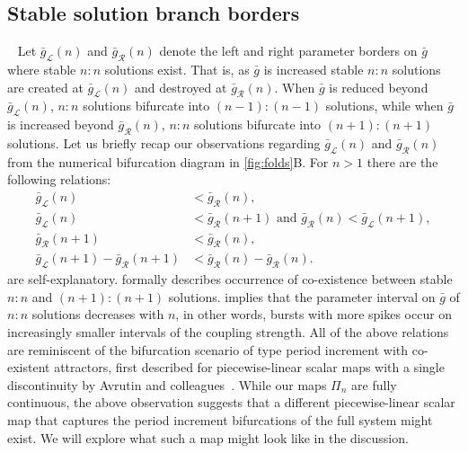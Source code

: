 \subsection{Stable solution branch borders}
~\label{sec:borders}
Let $\bar g_{\mathcal{L}}(n)$ and $\bar g_{\mathcal{R}}(n)$ denote the left and right parameter borders on $\bar g$ where stable $n:n$ solutions exist.
That is, as $\bar g$ is increased stable $n:n$ solutions are created at $\bar g_{\mathcal{L}}(n)$ and destroyed at $\bar g_{\mathcal{R}}(n)$.
When $\bar g$ is reduced beyond $\bar g_{\mathcal{L}}(n)$, $n:n$ solutions bifurcate into $(n-1):(n-1)$ solutions, while when $\bar g$ is increased beyond $\bar g_{\mathcal{R}}(n)$, $n:n$ solutions bifurcate into $(n+1):(n+1)$ solutions.
Let us briefly recap our observations regarding $\bar g_{\mathcal{L}}(n)$ and $\bar g_{\mathcal{R}}(n)$ from the numerical bifurcation diagram in \cref{fig:folds}B.
For $n>1$ there are the following relations:
\begin{align}
	\bar g_{\mathcal{L}}(n)                               & < \bar g_{\mathcal{R}}(n)\label{eq:easy1},                                                                 \\
	\bar g_{\mathcal{L}}(n)                               & < \bar g_{\mathcal{R}}(n+1)\text{ and } \bar g_{\mathcal{R}}(n)<\bar g_{\mathcal{L}}(n+1)\label{eq:easy2}, \\
	\bar g_{\mathcal{R}}(n+1)                             & < \bar g_{\mathcal{R}}(n)\label{eq:coexistence},                                                           \\
	\bar g_{\mathcal{L}}(n+1) - \bar g_{\mathcal{R}}(n+1) & < \bar g_{\mathcal{R}}(n) - \bar g_{\mathcal{R}}(n)\label{eq:robustness}.
\end{align}
 are self-explanatory.
 formally describes occurrence of co-existence between stable $n:n$ and $(n+1):(n+1)$ solutions.
 implies that the parameter interval on $\bar g$ of $n:n$ solutions decreases with $n$, in other words, bursts with more spikes occur on increasingly smaller intervals of the coupling strength.
All of the above relations are reminiscent of the bifurcation scenario of type period increment with co-existent attractors, first described for piecewise-linear scalar maps with a single discontinuity by Avrutin and colleagues~\cite[e.g.
	see][]{gardini2012,tramontana2012,avrutin2011}.
While our maps $\Pi_n$ are fully continuous, the above observation suggests that a different piecewise-linear scalar map that captures the period increment bifurcations of the full system might exist.
We will explore what such a map might look like in the discussion.

